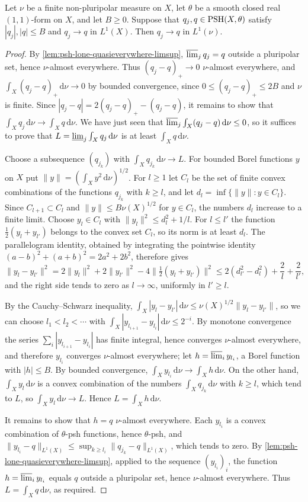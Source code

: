 \begin{lemma}\label{lem:bounded-psh-nonpluripolar-measure-continuity}
Let $\nu$ be a finite non-pluripolar measure on $X$, let $\theta$ be a smooth closed real $(1,1)$-form on $X$, and let $B\geq0$. Suppose that $q_j,q\in\mathrm{PSH}(X,\theta)$ satisfy $|q_j|,|q|\leq B$ and $q_j\to q$ in $L^1(X)$. Then $q_j\to q$ in $L^1(\nu)$.
\end{lemma}
\begin{proof}
By \cref{lem:psh-lone-quasieverywhere-limsup}, $\varlimsup_jq_j=q$ outside a pluripolar set, hence $\nu$-almost everywhere. Thus $(q_j-q)_+\to0$ $\nu$-almost everywhere, and $\int_X(q_j-q)_+\,\mathrm d\nu\to0$ by bounded convergence, since $0\leq(q_j-q)_+\leq2B$ and $\nu$ is finite. Since $|q_j-q|=2(q_j-q)_+-(q_j-q)$, it remains to show that $\int_Xq_j\,\mathrm d\nu\to\int_Xq\,\mathrm d\nu$. We have just seen that $\varlimsup_j\int_X(q_j-q)\,\mathrm d\nu\leq0$, so it suffices to prove that $L=\varliminf_j\int_Xq_j\,\mathrm d\nu$ is at least $\int_Xq\,\mathrm d\nu$.

Choose a subsequence $(q_{j_k})$ with $\int_Xq_{j_k}\,\mathrm d\nu\to L$. For bounded Borel functions $y$ on $X$ put $\|y\|=(\int_Xy^2\,\mathrm d\nu)^{1/2}$. For $l\geq1$ let $C_l$ be the set of finite convex combinations of the functions $q_{j_k}$ with $k\geq l$, and let $d_l=\inf\{\|y\|:y\in C_l\}$. Since $C_{l+1}\subset C_l$ and $\|y\|\leq B\nu(X)^{1/2}$ for $y\in C_l$, the numbers $d_l$ increase to a finite limit. Choose $y_l\in C_l$ with $\|y_l\|^2\leq d_l^2+1/l$. For $l\leq l'$ the function $\frac12(y_l+y_{l'})$ belongs to the convex set $C_l$, so its norm is at least $d_l$. The parallelogram identity, obtained by integrating the pointwise identity $(a-b)^2+(a+b)^2=2a^2+2b^2$, therefore gives
\[
 \|y_l-y_{l'}\|^2=2\|y_l\|^2+2\|y_{l'}\|^2-4\bigl\|\tfrac12(y_l+y_{l'})\bigr\|^2
 \leq2(d_{l'}^2-d_l^2)+\frac2l+\frac2{l'},
\]
and the right side tends to zero as $l\to\infty$, uniformly in $l'\geq l$.

By the Cauchy--Schwarz inequality, $\int_X|y_l-y_{l'}|\,\mathrm d\nu\leq\nu(X)^{1/2}\|y_l-y_{l'}\|$, so we can choose $l_1<l_2<\cdots$ with $\int_X|y_{l_{i+1}}-y_{l_i}|\,\mathrm d\nu\leq2^{-i}$. By monotone convergence the series $\sum_i|y_{l_{i+1}}-y_{l_i}|$ has finite integral, hence converges $\nu$-almost everywhere, and therefore $y_{l_i}$ converges $\nu$-almost everywhere; let $h=\varlimsup_iy_{l_i}$, a Borel function with $|h|\leq B$. By bounded convergence, $\int_Xy_{l_i}\,\mathrm d\nu\to\int_Xh\,\mathrm d\nu$. On the other hand, $\int_Xy_l\,\mathrm d\nu$ is a convex combination of the numbers $\int_Xq_{j_k}\,\mathrm d\nu$ with $k\geq l$, which tend to $L$, so $\int_Xy_l\,\mathrm d\nu\to L$. Hence $L=\int_Xh\,\mathrm d\nu$.

It remains to show that $h=q$ $\nu$-almost everywhere. Each $y_{l_i}$ is a convex combination of $\theta$-psh functions, hence $\theta$-psh, and $\|y_{l_i}-q\|_{L^1(X)}\leq\sup_{k\geq l_i}\|q_{j_k}-q\|_{L^1(X)}$, which tends to zero. By \cref{lem:psh-lone-quasieverywhere-limsup}, applied to the sequence $(y_{l_i})_i$, the function $h=\varlimsup_iy_{l_i}$ equals $q$ outside a pluripolar set, hence $\nu$-almost everywhere. Thus $L=\int_Xq\,\mathrm d\nu$, as required.
\end{proof}
